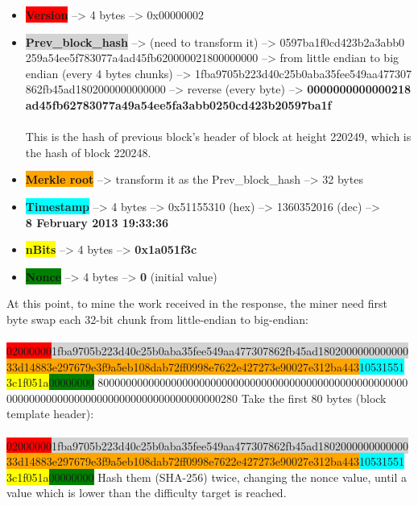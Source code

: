 \begin{itemize}
    \item \colorbox{red}{\textbf{Version}} --> 4 bytes --> 0x00000002  
    \item \colorbox{lightgray} {\textbf{Prev\_block\_hash}} --> (need to transform it) --> 0597ba1f0cd423b2a3abb0\\259a54ee5f783077a4ad45fb620000021800000000 --> from little endian to big endian (every 4 bytes chunks) --> 1fba9705b223d40c25b0aba35fee549aa477307\\862fb45ad1802000000000000 --> reverse (every byte) --> \textbf{0000000000000218\\ad45fb62783077a49a54ee5fa3abb0250cd423b20597ba1f} \\\\
    This is the hash of previous block's header of  block at height 220249, which is the hash of block 220248. 
    \item \colorbox{orange}{\textbf{Merkle root}} --> transform it as the Prev\_block\_hash --> 32 bytes  
    \item \colorbox{cyan}{\textbf{\textbf{Timestamp}}} --> 4 bytes --> 0x51155310 (hex) --> 1360352016 (dec) --> \\\textbf{8 February 2013 19:33:36}  
    \item \colorbox{yellow}{\textbf{\textbf{nBits}}} --> 4 bytes --> \textbf{0x1a051f3c} 
    \item \colorbox{green}{\textbf{\textbf{Nonce}}} --> 4 bytes --> \textbf{0} (initial value) 
\end{itemize}
\medskip
At this point, to mine the work received in the response, the miner need first byte swap each 32-bit chunk from little-endian to big-endian:\\\\
\colorbox{red}{02000000}\colorbox{lightgray}{1fba9705b223d40c25b0aba35fee549aa477307862fb45ad1802000000000000}\\\colorbox{orange}{33d14883e297679e3f9a5eb108dab72ff0998e7622e427273e90027e312ba443}\colorbox{cyan}{10531551}\\\colorbox{yellow}{3c1f051a}\colorbox{green}{00000000}
8000000000000000000000000000000000000000000000000000000\\00000000000000000000000000000000000000280
\newline\newline
Take the first 80 bytes (block template header):\\\\
\colorbox{red}{02000000}\colorbox{lightgray}{1fba9705b223d40c25b0aba35fee549aa477307862fb45ad1802000000000000}\\\colorbox{orange}{33d14883e297679e3f9a5eb108dab72ff0998e7622e427273e90027e312ba443}\colorbox{cyan}{10531551}\\\colorbox{yellow}{3c1f051a}\colorbox{green}{00000000}
\newline\newline
Hash them (SHA-256) twice, changing the nonce value, until a value which is lower than the difficulty target is reached.\\
